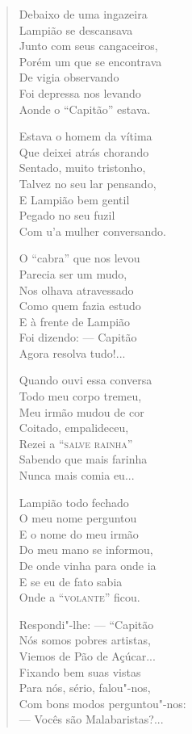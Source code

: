 \begin{verse}
Debaixo de uma ingazeira \\
Lampião se descansava \\
Junto com seus cangaceiros, \\
Porém um que se encontrava \\
De vigia observando \\
Foi depressa nos levando \\
Aonde o ``Capitão'' estava. 


Estava o homem da vítima \\
Que deixei atrás chorando \\
Sentado, muito tristonho, \\
Talvez no seu lar pensando, \\
E Lampião bem gentil \\
Pegado no seu fuzil \\
Com u'a mulher conversando. 

O ``cabra'' que nos levou \\
Parecia ser um mudo, \\
Nos olhava atravessado \\
Como quem fazia estudo \\
E à frente de Lampião \\
Foi dizendo: ---  Capitão \\
Agora resolva tudo!... 

Quando ouvi essa conversa \\
Todo meu corpo tremeu, \\
Meu irmão mudou de cor \\
Coitado, empalideceu, \\
Rezei a ``\textsc{salve rainha}'' \\
Sabendo que mais farinha \\
Nunca mais comia eu...

Lampião todo fechado \\
O meu nome perguntou \\
E o nome do meu irmão \\
Do meu mano se informou, \\
De onde vinha para onde ia \\
E se eu de fato sabia \\
Onde a ``\textsc{volante}'' ficou. 


Respondi"-lhe: ---  ``Capitão \\
Nós somos pobres artistas, \\
Viemos de Pão de Açúcar... \\
Fixando bem suas vistas \\
Para nós, sério, falou"-nos, \\
Com bons modos perguntou"-nos:\\
---  Vocês são Malabaristas?...


\end{verse}
